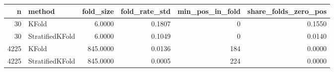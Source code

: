 \begin{tabular}{rlrrrr}
\toprule
n & method & fold\_size & fold\_rate\_std & min\_pos\_in\_fold & share\_folds\_zero\_pos \\
\midrule
30 & KFold & 6.0000 & 0.1807 & 0 & 0.1550 \\
30 & StratifiedKFold & 6.0000 & 0.1049 & 0 & 0.0140 \\
4225 & KFold & 845.0000 & 0.0136 & 184 & 0.0000 \\
4225 & StratifiedKFold & 845.0000 & 0.0005 & 224 & 0.0000 \\
\bottomrule
\end{tabular}
